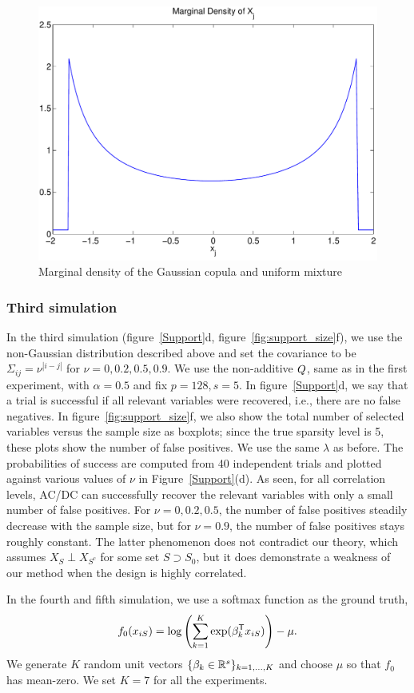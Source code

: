 \begin{figure}
\includegraphics[width=.4\textwidth]{figs/copula_marginal}
\caption{Marginal density of the Gaussian copula and uniform mixture}
\label{fig:copula_marginal}
\end{figure}

\subsubsection{Third simulation}
In the \textrm{third simulation} (figure~\ref{Support}d, figure~\ref{fig:support_size}f), we use the
non-Gaussian distribution described above and set the covariance
to be $\Sigma_{ij}=\nu^{|i-j|}$ for $\nu = 0, 0.2, 0.5, 0.9$. We use the
non-additive $Q$, same as in the first experiment, with $\alpha=0.5$
and fix $p=128, s=5$. In figure~\ref{Support}d, we say that a trial is successful 
if all relevant variables were recovered, i.e., there are no false negatives. In figure~\ref{fig:support_size}f, we also show the total number of selected variables versus the sample size as boxplots; since the true sparsity level is 5, these plots show the number of false positives. We
use the same $\lambda$ as before. The probabilities of success are
computed from 40 independent trials and plotted against various values
of $\nu$ in Figure~\ref{Support}(d). As seen, for all correlation levels, AC/DC can successfully recover the relevant
variables with only a small number of false positives. For $\nu = 0, 0.2, 0.5$, the number of false positives steadily decrease with the sample size, but for $\nu = 0.9$, the number of false positives stays roughly constant. The latter phenomenon does not contradict our theory, which assumes $X_S \perp X_{S^c}$ for some set $S \supset S_0$, but it does demonstrate a weakness of our method when the design is highly correlated. 

In the fourth and fifth simulation, we use a softmax function as the ground truth,
\begin{align}
f_0(x_{iS}) = \log \left( \sum_{k=1}^K \exp( \beta_k^{\mathsf{T}} x_{iS} ) \right) - \mu.
\end{align}
We generate $K$ random unit vectors $\{\beta_k \in {\mathbb R}^s\}_{k=1,\ldots,K}$ and choose $\mu$ so that $f_0$ has mean-zero. We set $K = 7$ for all the experiments. 

